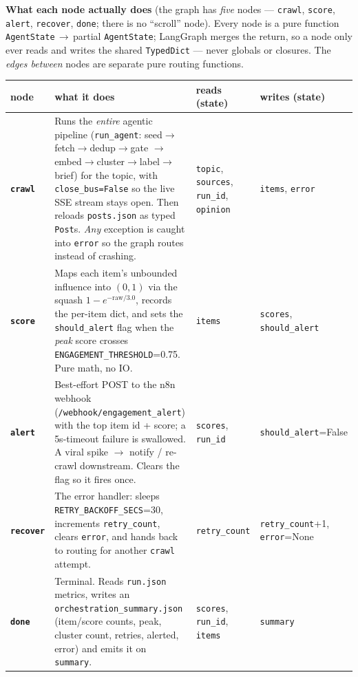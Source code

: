 \documentclass[11pt,a4paper]{article}
\newcommand{\code}[1]{\texttt{\small #1}}
\begin{document}
\noindent\textbf{What each node actually does} (the graph has \emph{five} nodes ---
\code{crawl}, \code{score}, \code{alert}, \code{recover}, \code{done}; there is no ``scroll''
node). Every node is a pure function \code{AgentState}\,$\rightarrow$\,partial \code{AgentState};
LangGraph merges the return, so a node only ever reads and writes the shared \code{TypedDict} ---
never globals or closures. The \emph{edges between} nodes are separate pure routing functions.

\renewcommand{\arraystretch}{1.3}
\begin{center}\small
\begin{tabular}{@{}>{\bfseries}l p{6.0cm} p{2.4cm} p{2.4cm}@{}}
\toprule
node & what it does & reads (state) & writes (state) \\
\midrule
\code{crawl} &
Runs the \emph{entire} agentic pipeline (\code{run\_agent}: seed$\to$fetch$\to$dedup$\to$gate
$\to$embed$\to$cluster$\to$label$\to$brief) for the topic, with \code{close\_bus=False} so the
live SSE stream stays open. Then reloads \code{posts.json} as typed \code{Post}s. \emph{Any}
exception is caught into \code{error} so the graph routes instead of crashing. &
\code{topic}, \code{sources}, \code{run\_id}, \code{opinion} &
\code{items}, \code{error} \\
\code{score} &
Maps each item's unbounded influence into $(0,1)$ via the squash
$1-e^{-\text{raw}/3.0}$, records the per-item dict, and sets the \code{should\_alert} flag
when the \emph{peak} score crosses \code{ENGAGEMENT\_THRESHOLD}=0.75. Pure math, no IO. &
\code{items} &
\code{scores}, \code{should\_alert} \\
\code{alert} &
Best-effort POST to the n8n webhook (\code{/webhook/engagement\_alert}) with the top item
id + score; a 5s-timeout failure is swallowed. A viral spike $\rightarrow$ notify / re-crawl
downstream. Clears the flag so it fires once. &
\code{scores}, \code{run\_id} &
\code{should\_alert}=False \\
\code{recover} &
The error handler: sleeps \code{RETRY\_BACKOFF\_SECS}=30, increments \code{retry\_count},
clears \code{error}, and hands back to routing for another \code{crawl} attempt. &
\code{retry\_count} &
\code{retry\_count}+1, \code{error}=None \\
\code{done} &
Terminal. Reads \code{run.json} metrics, writes an
\code{orchestration\_summary.json} (item/score counts, peak, cluster count, retries, alerted,
error) and emits it on \code{summary}. &
\code{scores}, \code{run\_id}, \code{items} &
\code{summary} \\
\bottomrule
\end{tabular}
\end{center}
\end{document}

